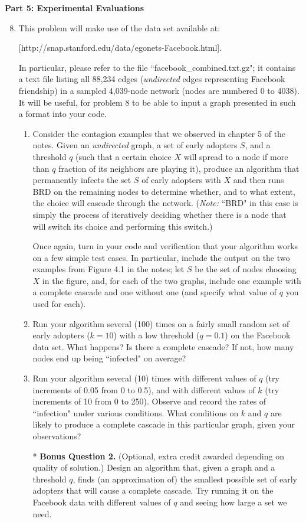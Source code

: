 \documentclass[11pt,letterpaper]{article}
\theoremstyle{definition}
\begin{document}
\noindent
{\Large\textbf{Part 5: Experimental Evaluations}\par}

\medskip


\begin{enumerate}
\setcounter{enumi}{7}
\item 
This problem will make use of the data set available at:
 
[http://snap.stanford.edu/data/egonets-Facebook.html]. 

\medskip
In particular, please refer to the file ``facebook\_combined.txt.gz"; it contains a text file listing all 88,234 edges (\emph{undirected} edges representing Facebook friendship) in a sampled 4,039-node network (nodes are numbered 0 to 4038). It will be useful, for problem 8 to be able to input a graph presented in such a format into your code.

\begin{enumerate}
\item Consider the contagion examples that we observed in chapter 5 of the notes. Given an \emph{undirected} graph, a set of early adopters $S$, and a threshold $q$ (such that a certain choice $X$ will spread to a node if more than $q$ fraction of its neighbors are playing it), produce an algorithm that permanently infects the set $S$ of early adopters with $X$ and then runs BRD on the remaining nodes to determine whether, and to what extent, the choice will cascade through the network. (\emph{Note:} ``BRD" in this case is simply the process of iteratively deciding whether there is a node that will switch its choice and performing this switch.) 

Once again, turn in your code and verification that your algorithm works on a few simple test cases. In particular, include the output on the two examples from Figure 4.1 in the notes; let $S$ be the set of nodes choosing $X$ in the figure, and, for each of the two graphs, include one example with a complete cascade and one without one (and specify what value of $q$ you used for each).
\item Run your algorithm several (100) times on a fairly small random set of early adopters ($k = 10$) with a low threshold ($q = 0.1$) on the Facebook data set. What happens? Is there a complete cascade? If not, how many nodes end up being ``infected" on average?
\item Run your algorithm several (10) times with different values of $q$ (try increments of 0.05 from 0 to 0.5), and with different values of $k$ (try increments of 10 from 0 to 250). Observe and record the rates of ``infection" under various conditions. What conditions on $k$ and $q$ are likely to produce a complete cascade in this particular graph, given your observations?
\item[*] \textbf{Bonus Question 2.} (Optional, extra credit awarded depending on quality of solution.) Design an algorithm that, given a graph and a threshold $q$, finds (an approximation of) the smallest possible set of early adopters that will cause a complete cascade. Try running it on the Facebook data with different values of $q$ and seeing how large a set we need.
\end{enumerate}


\end{enumerate}
\end{document}
